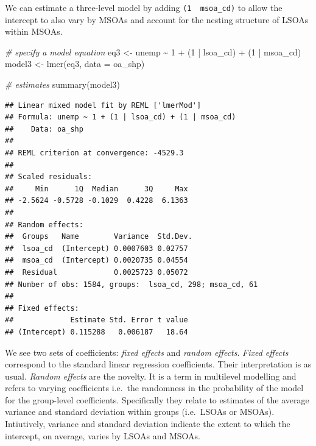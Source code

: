 \documentclass[
]{book}
\newenvironment{Shaded}{\begin{snugshade}}{\end{snugshade}}
\newcommand{\AttributeTok}[1]{\textcolor[rgb]{0.77,0.63,0.00}{#1}}
\newcommand{\CommentTok}[1]{\textcolor[rgb]{0.56,0.35,0.01}{\textit{#1}}}
\newcommand{\DecValTok}[1]{\textcolor[rgb]{0.00,0.00,0.81}{#1}}
\newcommand{\FunctionTok}[1]{\textcolor[rgb]{0.00,0.00,0.00}{#1}}
\newcommand{\NormalTok}[1]{#1}
\newcommand{\OtherTok}[1]{\textcolor[rgb]{0.56,0.35,0.01}{#1}}
\newcommand{\SpecialCharTok}[1]{\textcolor[rgb]{0.00,0.00,0.00}{#1}}
\begin{document}
We can estimate a three-level model by adding \texttt{(1\ \textbar{}\ msoa\_cd)} to allow the intercept to also vary by MSOAs and account for the nesting structure of LSOAs within MSOAs.

\begin{Shaded}
\begin{Highlighting}[]
\CommentTok{\# specify a model equation}
\NormalTok{eq3 }\OtherTok{\textless{}{-}}\NormalTok{ unemp }\SpecialCharTok{\textasciitilde{}} \DecValTok{1} \SpecialCharTok{+}\NormalTok{ (}\DecValTok{1} \SpecialCharTok{|}\NormalTok{ lsoa\_cd) }\SpecialCharTok{+}\NormalTok{ (}\DecValTok{1} \SpecialCharTok{|}\NormalTok{ msoa\_cd)}
\NormalTok{model3 }\OtherTok{\textless{}{-}} \FunctionTok{lmer}\NormalTok{(eq3, }\AttributeTok{data =}\NormalTok{ oa\_shp)}

\CommentTok{\# estimates}
\FunctionTok{summary}\NormalTok{(model3)}
\end{Highlighting}
\end{Shaded}

\begin{verbatim}
## Linear mixed model fit by REML ['lmerMod']
## Formula: unemp ~ 1 + (1 | lsoa_cd) + (1 | msoa_cd)
##    Data: oa_shp
## 
## REML criterion at convergence: -4529.3
## 
## Scaled residuals: 
##     Min      1Q  Median      3Q     Max 
## -2.5624 -0.5728 -0.1029  0.4228  6.1363 
## 
## Random effects:
##  Groups   Name        Variance  Std.Dev.
##  lsoa_cd  (Intercept) 0.0007603 0.02757 
##  msoa_cd  (Intercept) 0.0020735 0.04554 
##  Residual             0.0025723 0.05072 
## Number of obs: 1584, groups:  lsoa_cd, 298; msoa_cd, 61
## 
## Fixed effects:
##             Estimate Std. Error t value
## (Intercept) 0.115288   0.006187   18.64
\end{verbatim}

We see two sets of coefficients: \emph{fixed effects} and \emph{random effects}. \emph{Fixed effects} correspond to the standard linear regression coefficients. Their interpretation is as usual. \emph{Random effects} are the novelty. It is a term in multilevel modelling and refers to varying coefficients i.e.~the randomness in the probability of the model for the group-level coefficients. Specifically they relate to estimates of the average variance and standard deviation within groups (i.e.~LSOAs or MSOAs). Intiutively, variance and standard deviation indicate the extent to which the intercept, on average, varies by LSOAs and MSOAs.
\end{document}
